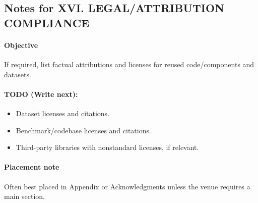 \subsection*{Notes for XVI. LEGAL/ATTRIBUTION COMPLIANCE}
\paragraph{Objective}
If required, list factual attributions and licenses for reused code/components and datasets.

\paragraph{TODO (Write next):}
\begin{itemize}
  \item Dataset licenses and citations.
  \item Benchmark/codebase licenses and citations.
  \item Third-party libraries with nonstandard licenses, if relevant.
\end{itemize}

\paragraph{Placement note}
Often best placed in Appendix or Acknowledgments unless the venue requires a main section.
